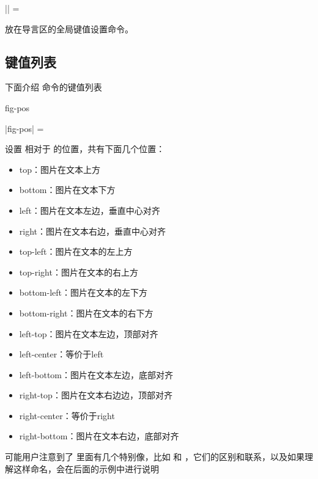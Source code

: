 \documentclass{l3doc}
\begin{document}
\begin{function}[added = 2022-01-22]{\textfiguresetup}
  \begin{syntax}
    |\textfiguresetup| = 
  \end{syntax}
  放在导言区的全局键值设置命令。
\end{function}



\subsection{键值列表}
下面介绍  命令的键值列表
\begin{function}[added = 2022-01-22, updated = 2022-01-22]{fig-pos}
  \begin{syntax}
    |fig-pos| =  
  \end{syntax}
  设置  相对于 的位置，共有下面几个位置：
    \begin{itemize}
      \item top：图片在文本上方
      \item bottom：图片在文本下方
      \item left：图片在文本左边，垂直中心对齐
      \item right：图片在文本右边，垂直中心对齐
      \item top-left：图片在文本的左上方
      \item top-right：图片在文本的右上方
      \item bottom-left：图片在文本的左下方
      \item bottom-right：图片在文本的右下方
      \item left-top：图片在文本左边，顶部对齐
      \item left-center：等价于left
      \item left-bottom：图片在文本左边，底部对齐
      \item right-top：图片在文本右边边，顶部对齐
      \item right-center：等价于right
      \item right-bottom：图片在文本右边，底部对齐
    \end{itemize}
  可能用户注意到了  里面有几个特别像，比如  和 ，它们的区别和联系，以及如果理解这样命名，会在后面的示例中进行说明
\end{function}
\end{document}
